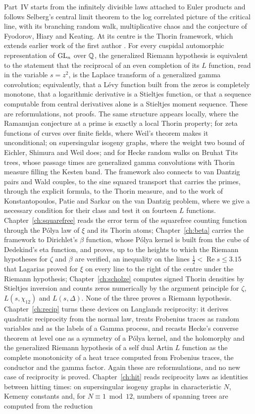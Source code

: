 Part~IV starts from the infinitely divisible laws attached to Euler products and follows Selberg's central limit theorem to the log correlated picture of the critical line, with its branching random walk, multiplicative chaos and the conjecture of Fyodorov, Hiary and Keating. At its centre is the Thorin framework, which extends earlier work of the first author \cite{polson2018vdp}. For every cuspidal automorphic representation of $\mathrm{GL}_n$ over $\mathbb{Q}$, the generalized Riemann hypothesis is equivalent to the statement that the reciprocal of an even completion of its $L$ function, read in the variable $s=z^2$, is the Laplace transform of a generalized gamma convolution; equivalently, that a L\'evy function built from the zeros is completely monotone, that a logarithmic derivative is a Stieltjes function, or that a sequence computable from central derivatives alone is a Stieltjes moment sequence. These are reformulations, not proofs. The same structure appears locally, where the Ramanujan conjecture at a prime is exactly a local Thorin property; for zeta functions of curves over finite fields, where Weil's theorem makes it unconditional; on supersingular isogeny graphs, where the weight two bound of Eichler, Shimura and Weil does; and for Hecke random walks on Bruhat Tits trees, whose passage times are generalized gamma convolutions with Thorin measure filling the Kesten band. The framework also connects to van Dantzig pairs and Wald couples, to the sine squared transport that carries the primes, through the explicit formula, to the Thorin measure, and to the work of Konstantopoulos, Patie and Sarkar on the van Dantzig problem, where we give a necessary condition for their class and test it on fourteen $L$ functions. Chapter~\ref{ch:squarefree} reads the error term of the squarefree counting function through the P\'olya law of $\xi$ and its Thorin atoms; Chapter~\ref{ch:beta} carries the framework to Dirichlet's $\beta$ function, whose P\'olya kernel is built from the cube of Dedekind's eta function, and proves, up to the heights to which the Riemann hypotheses for $\zeta$ and $\beta$ are verified, an inequality on the lines $\frac12<\operatorname{Re}s\le3.15$ that Lagarias proved for $\xi$ on every line to the right of the centre under the Riemann hypothesis; Chapter~\ref{ch:scholze} computes signed Thorin densities by Stieltjes inversion and counts zeros numerically by the argument principle for $\zeta$, $L(s,\chi_{12})$ and $L(s,\Delta)$. None of the three proves a Riemann hypothesis. Chapter~\ref{ch:recip} turns these devices on Langlands reciprocity: it derives quadratic reciprocity from the normal law, treats Frobenius traces as random variables and as the labels of a Gamma process, and recasts Hecke's converse theorem at level one as a symmetry of a P\'olya kernel, and the holomorphy and the generalized Riemann hypothesis of a self dual Artin $L$ function as the complete monotonicity of a heat trace computed from Frobenius traces, the conductor and the gamma factor. Again these are reformulations, and no new case of reciprocity is proved. Chapter~\ref{ch:hit} reads reciprocity laws as identities between hitting times: on supersingular isogeny graphs in characteristic $N$, Kemeny constants and, for $N\equiv1\bmod12$, numbers of spanning trees are computed from the reduction 